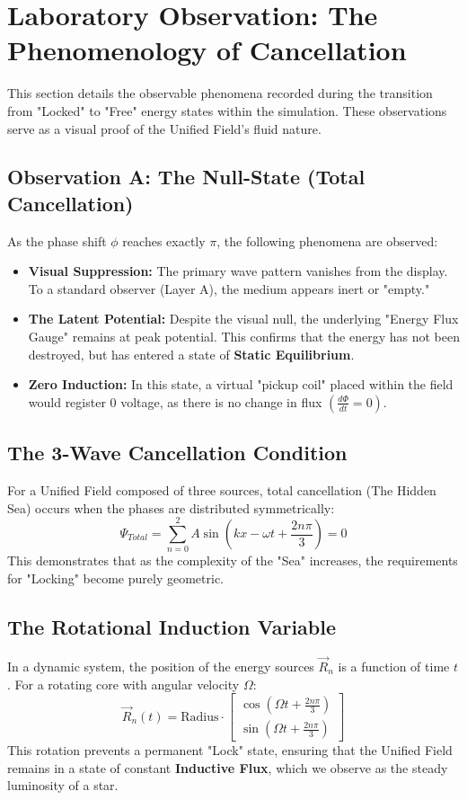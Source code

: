\documentclass[11pt]{article}
\begin{document}
\section*{Laboratory Observation: The Phenomenology of Cancellation}

This section details the observable phenomena recorded during the transition from "Locked" to "Free" energy states within the simulation. These observations serve as a visual proof of the Unified Field's fluid nature.

\subsection*{Observation A: The Null-State (Total Cancellation)}
As the phase shift $\phi$ reaches exactly $\pi$, the following phenomena are observed:
\begin{itemize}
    \item \textbf{Visual Suppression:} The primary wave pattern vanishes from the display. To a standard observer (Layer A), the medium appears inert or "empty."
    \item \textbf{The Latent Potential:} Despite the visual null, the underlying "Energy Flux Gauge" remains at peak potential. This confirms that the energy has not been destroyed, but has entered a state of \textbf{Static Equilibrium}.
    \item \textbf{Zero Induction:} In this state, a virtual "pickup coil" placed within the field would register $0$ voltage, as there is no change in flux $(\frac{d\Phi}{dt} = 0)$.
\end{itemize}
\subsection*{The 3-Wave Cancellation Condition}
For a Unified Field composed of three sources, total cancellation (The Hidden Sea) occurs when the phases are distributed symmetrically:
\begin{equation}
    \Psi_{Total} = \sum_{n=0}^{2} A \sin(kx - \omega t + \frac{2n\pi}{3}) = 0
\end{equation}
This demonstrates that as the complexity of the "Sea" increases, the requirements for "Locking" become purely geometric.

\subsection*{The Rotational Induction Variable}
In a dynamic system, the position of the energy sources $\vec{R}_n$ is a function of time $t$. For a rotating core with angular velocity $\Omega$:
\begin{equation}
    \vec{R}_n(t) = \text{Radius} \cdot \begin{bmatrix} \cos(\Omega t + \frac{2n\pi}{3}) \\ \sin(\Omega t + \frac{2n\pi}{3}) \end{bmatrix}
\end{equation}
This rotation prevents a permanent "Lock" state, ensuring that the Unified Field remains in a state of constant \textbf{Inductive Flux}, which we observe as the steady luminosity of a star.
\end{document}
